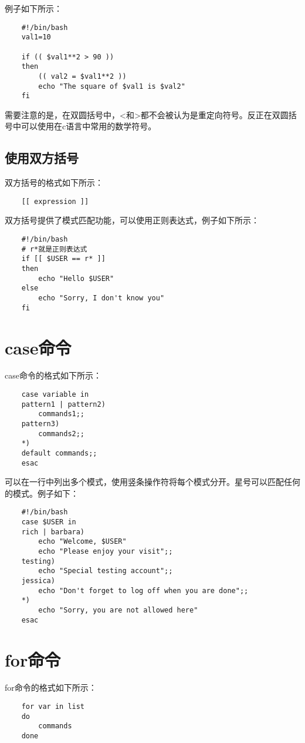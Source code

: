 \documentclass[a4paper,left=2.5cm,right=2.5cm,11pt]{article}
\begin{document}
	例子如下所示：
	\begin{lstlisting}
	#!/bin/bash
	val1=10

	if (( $val1**2 > 90 ))
	then
		(( val2 = $val1**2 ))
		echo "The square of $val1 is $val2"
	fi
	\end{lstlisting}

	需要注意的是，在双圆括号中，<和>都不会被认为是重定向符号。反正在双圆括号中可以使用在c语言中常用的数学符号。

\subsection{使用双方括号}
	双方括号的格式如下所示：
	\begin{lstlisting}
	[[ expression ]]
	\end{lstlisting}

	双方括号提供了模式匹配功能，可以使用正则表达式，例子如下所示：
	\begin{lstlisting}
	#!/bin/bash
	# r*就是正则表达式
	if [[ $USER == r* ]]
	then
		echo "Hello $USER"
	else
		echo "Sorry, I don't know you"
	fi
	\end{lstlisting}

\section{case命令}
	case命令的格式如下所示：
	\begin{lstlisting}
	case variable in
	pattern1 | pattern2) 
		commands1;;
	pattern3) 
		commands2;;
	*) 
	default	commands;;
	esac
	\end{lstlisting}

	可以在一行中列出多个模式，使用竖条操作符将每个模式分开。星号可以匹配任何的模式。例子如下：
	\begin{lstlisting}
	#!/bin/bash
	case $USER in
	rich | barbara)
		echo "Welcome, $USER"
		echo "Please enjoy your visit";;
	testing)
		echo "Special testing account";;
	jessica)
		echo "Don't forget to log off when you are done";;
	*)
		echo "Sorry, you are not allowed here"
	esac
	\end{lstlisting}

\section{for命令}
	for命令的格式如下所示：
	\begin{lstlisting}
	for var in list
	do
		commands
	done
	\end{lstlisting}
\end{document}
